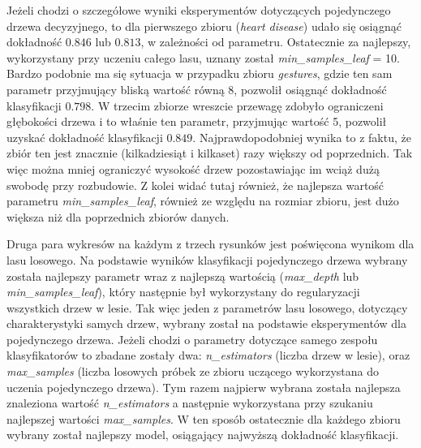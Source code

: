 \documentclass{classrep}
\begin{document}
{{            Jeżeli chodzi o szczegółowe wyniki eksperymentów dotyczących pojedynczego drzewa decyzyjnego, to dla pierwszego zbioru (\emph{heart disease}) udało się osiągnąć dokładność $0.846$ lub $0.813$, w zależności od parametru. Ostatecznie za najlepszy, wykorzystany przy uczeniu całego lasu, uznany został \emph{min\_samples\_leaf} = 10. Bardzo podobnie ma się sytuacja w przypadku zbioru \emph{gestures}, gdzie ten sam parametr przyjmujący bliską wartość równą 8, pozwolił osiągnąć dokładność klasyfikacji $0.798$. W trzecim zbiorze wreszcie przewagę zdobyło ograniczeni głębokości drzewa i to właśnie ten parametr, przyjmując wartość 5, pozwolił uzyskać dokładność klasyfikacji $0.849$. Najprawdopodobniej wynika to z faktu, że zbiór ten jest znacznie (kilkadziesiąt i kilkaset) razy większy od poprzednich. Tak więc można mniej ograniczyć wysokość drzew pozostawiając im wciąż dużą swobodę przy rozbudowie. Z kolei widać tutaj również, że najlepsza wartość parametru \emph{min\_samples\_leaf}, również ze względu na rozmiar zbioru, jest dużo większa niż dla poprzednich zbiorów danych.
            
            Druga para wykresów na każdym z trzech rysunków jest poświęcona wynikom dla lasu losowego. Na podstawie wyników klasyfikacji pojedynczego drzewa wybrany została najlepszy parametr wraz z najlepszą wartością (\emph{max\_depth} lub \emph{min\_samples\_leaf}), który następnie był wykorzystany do regularyzacji wszystkich drzew w lesie. Tak więc jeden z parametrów lasu losowego, dotyczący charakterystyki samych drzew, wybrany został na podstawie eksperymentów dla pojedynczego drzewa. Jeżeli chodzi o parametry dotyczące samego zespołu klasyfikatorów to zbadane zostały dwa: \emph{n\_estimators} (liczba drzew w lesie), oraz \emph{max\_samples} (liczba losowych próbek ze zbioru uczącego wykorzystana do uczenia pojedynczego drzewa). Tym razem najpierw wybrana została najlepsza znaleziona wartość \emph{n\_estimators} a następnie wykorzystana przy szukaniu najlepszej wartości \emph{max\_samples}. W ten sposób ostatecznie dla każdego zbioru wybrany został najlepszy model, osiągający najwyższą dokładność klasyfikacji.
            
}}
\end{document}
